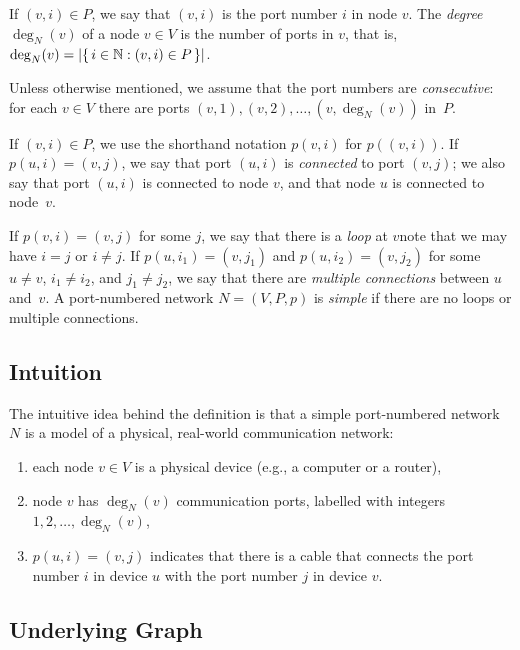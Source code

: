 If $(v,i) \in P$, we say that $(v,i)$ is the port number $i$ in node $v$. The \emph{degree} $\deg_N(v)$ of a node $v \in V$ is the number of ports in $v$, that is, $\deg_N(v) = |\{\,  i \in \mathbb{N} : (v,i) \in P  \,\}|$.

Unless otherwise mentioned, we assume that the port numbers are \emph{consecutive}: for each $v \in V$ there are ports $(v,1),\allowbreak (v,2),\allowbreak \dotsc,\allowbreak (v,\deg_N(v))$ in~$P$.

If $(v,i) \in P$, we use the shorthand notation $p(v,i)$ for $p((v,i))$. If $p(u,i) = (v,j)$, we say that port $(u,i)$ is \emph{connected} to port $(v,j)$; we also say that port $(u,i)$ is connected to node $v$, and that node $u$ is connected to node~$v$.

If $p(v,i) = (v,j)$ for some $j$, we say that there is a \emph{loop} at $v$\mydash note that we may have $i = j$ or $i \ne j$. If $p(u,i_1) = (v,j_1)$ and $p(u,i_2) = (v,j_2)$ for some $u \ne v$, $i_1 \ne i_2$, and $j_1 \ne j_2$, we say that there are \emph{multiple connections} between $u$ and~$v$. A port-numbered network $N = (V,P,p)$ is \emph{simple} if there are no loops or multiple connections. 

\subsection{Intuition}

The intuitive idea behind the definition is that a simple port-numbered network $N$ is a model of a physical, real-world communication network:
\begin{enumerate}
    \item each node $v \in V$ is a physical device (e.g., a computer or a router),
    \item node $v$ has $\deg_N(v)$ communication ports, labelled with integers $1,2,\dotsc,\allowbreak\deg_N(v)$,
    \item $p(u,i) = (v,j)$ indicates that there is a cable that connects the port number $i$ in device $u$ with the port number $j$ in device $v$.
\end{enumerate}

\subsection{Underlying Graph}

